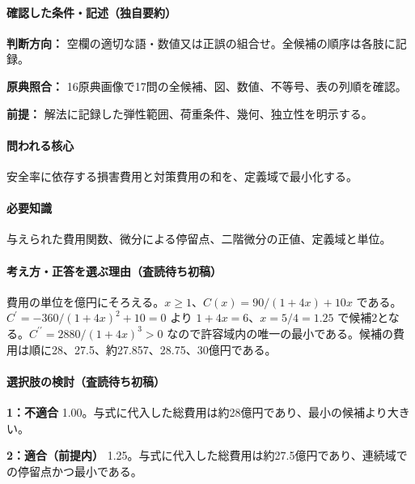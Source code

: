 \paragraph{確認した条件・記述（独自要約）}\mbox{}\par

\noindent\textbf{判断方向：} 空欄の適切な語・数値又は正誤の組合せ。全候補の順序は各肢に記録。\par

\noindent\textbf{原典照合：} 16原典画像で17問の全候補、図、数値、不等号、表の列順を確認。\par

\noindent\textbf{前提：} 解法に記録した弾性範囲、荷重条件、幾何、独立性を明示する。\par

\paragraph{問われる核心} 安全率に依存する損害費用と対策費用の和を、定義域で最小化する。

\paragraph{必要知識} 与えられた費用関数、微分による停留点、二階微分の正値、定義域と単位。

\paragraph{考え方・正答を選ぶ理由（査読待ち初稿）} 費用の単位を億円にそろえる。\(x\ge1\)、\(C(x)=90/(1+4x)+10x\) である。\(C^\prime=-360/(1+4x)^2+10=0\) より \(1+4x=6\)、\(x=5/4=1.25\) で候補2となる。\(C^{\prime\prime}=2880/(1+4x)^3>0\) なので許容域内の唯一の最小である。候補の費用は順に28、27.5、約27.857、28.75、30億円である。

\paragraph{選択肢の検討（査読待ち初稿）}\mbox{}\par

\noindent\textbf{1：不適合} 1.00。与式に代入した総費用は約28億円であり、最小の候補より大きい。\par

\noindent\textbf{2：適合（前提内）} 1.25。与式に代入した総費用は約27.5億円であり、連続域での停留点かつ最小である。\par

